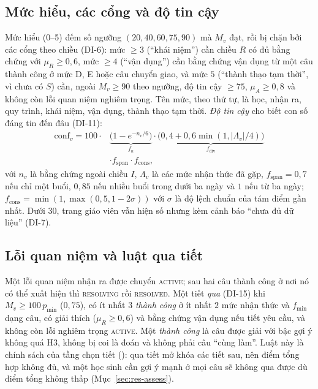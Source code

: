\subsection{Mức hiểu, các cổng và độ tin cậy}
Mức hiểu (0--5) đếm số ngưỡng $(20,40,60,75,90)$ mà $M_v$ đạt, rồi bị chặn bởi các cổng theo chiều (DI-6): mức $\ge3$ (``khái niệm'') cần chiều $R$ có đủ bằng chứng với $\mu_R\ge0{,}6$, mức $\ge4$ (``vận dụng'') cần bằng chứng vận dụng từ một câu thành công ở mức D, E hoặc câu chuyển giao, và mức $5$ (``thành thạo tạm thời'', vì chưa có $S$) cần, ngoài $M_v\ge90$ theo ngưỡng, độ tin cậy $\ge75$, $\mu_A\ge0{,}8$ và không còn lỗi quan niệm nghiêm trọng. Tên mức, theo thứ tự, là học, nhận ra, quy trình, khái niệm, vận dụng, thành thạo tạm thời. \emph{Độ tin cậy} cho biết con số đáng tin đến đâu (DI-11):
\begin{equation}
\begin{split}
\mathrm{conf}_v=100\cdot{}&\underbrace{\bigl(1-e^{-n_v/6}\bigr)}_{f_n}\cdot\underbrace{\bigl(0{,}4+0{,}6\min(1,|\Lambda_v|/4)\bigr)}_{f_{\text{div}}}\\
&\cdot f_{\text{span}}\cdot f_{\text{cons}},
\end{split}
\end{equation}
với $n_v$ là bằng chứng ngoài chiều $I$, $\Lambda_v$ là các mức nhận thức đã gặp, $f_{\text{span}}=0{,}7$ nếu chỉ một buổi, $0{,}85$ nếu nhiều buổi trong dưới ba ngày và $1$ nếu từ ba ngày; $f_{\text{cons}}=\min(1,\max(0{,}5,1-2\sigma))$ với $\sigma$ là độ lệch chuẩn của tám điểm gần nhất. Dưới $30$, trang giáo viên vẫn hiện số nhưng kèm cảnh báo ``chưa đủ dữ liệu'' (DI-7).

\subsection{Lỗi quan niệm và luật qua tiết}
Một lỗi quan niệm nhận ra được chuyển \textsc{active}; sau hai câu thành công ở nơi nó có thể xuất hiện thì \textsc{resolving} rồi \textsc{resolved}. Một tiết \emph{qua} (DI-15) khi $M_v\ge100\,p_{\min}$ ($0{,}75$), có ít nhất $3$ \emph{thành công} ở ít nhất $2$ mức nhận thức và $f_{\min}$ dạng câu, có giải thích ($\mu_R\ge0{,}6$) và bằng chứng vận dụng nếu tiết yêu cầu, và không còn lỗi nghiêm trọng \textsc{active}. Một \emph{thành công} là câu được giải với bậc gợi ý không quá H3, không bị coi là đoán và không phải câu ``cùng làm''. Luật này là chính sách của tầng chọn tiết (): qua tiết mở khóa các tiết sau, nên điểm tổng hợp không đủ, và một học sinh cần gợi ý mạnh ở mọi câu sẽ không qua được dù điểm tổng không thấp (Mục~\ref{sec:res-assess}).

